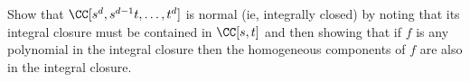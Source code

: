 \begin{exercise}\label{normality of RNC}
 Show that $\CC[s^d,s^{d-1}t,\dots, t^d]$ is normal (ie, integrally closed) by noting that its integral closure must be
 contained in $\CC[s,t]$ and then showing that if $f$ is any polynomial
 in the integral closure then the homogeneous components of $f$ are also in the integral closure.
\end{exercise}



